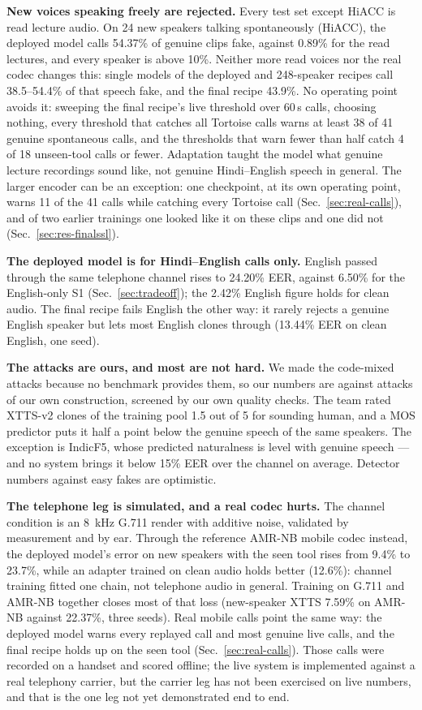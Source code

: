 \textbf{New voices speaking freely are rejected.} Every test set except HiACC is read
lecture audio. On 24 new speakers talking spontaneously (HiACC), the deployed model
calls 54.37\% of genuine clips fake, against 0.89\% for the read lectures, and every
speaker is above 10\%. Neither more read voices nor the real codec changes this: single
models of the deployed and 248-speaker recipes call 38.5--54.4\% of that speech fake, and
the final recipe 43.9\%. No operating point avoids it: sweeping the final recipe's live
threshold over 60\,s calls, choosing nothing, every threshold that catches all Tortoise calls
warns at least 38 of 41 genuine spontaneous calls, and the thresholds that warn fewer than
half catch 4 of 18 unseen-tool calls or fewer.
Adaptation taught the model what genuine lecture recordings sound like, not genuine
Hindi--English speech in general. The larger encoder can be an exception: one checkpoint, at
its own operating point, warns 11 of the 41 calls while catching every Tortoise call
(Sec.~\ref{sec:real-calls}), and of two earlier trainings one looked like it on these clips and
one did not (Sec.~\ref{sec:res-finalssl}).

\textbf{The deployed model is for Hindi--English calls only.} English passed through
the same telephone channel rises to 24.20\% EER, against 6.50\% for the English-only
S1 (Sec.~\ref{sec:tradeoff}); the 2.42\% English figure holds for clean audio. The final
recipe fails English the other way: it rarely rejects a genuine English speaker but lets
most English clones through (13.44\% EER on clean English, one seed).

\textbf{The attacks are ours, and most are not hard.} We made the code-mixed attacks
because no benchmark provides them, so our numbers are against attacks of our own
construction, screened by our own quality checks. The team rated XTTS-v2 clones of the training pool
1.5 out of 5 for sounding human, and a MOS predictor puts it half a point below the
genuine speech of the same speakers. The exception is IndicF5, whose predicted
naturalness is level with genuine speech --- and no system brings it below 15\% EER over
the channel on average. Detector numbers against easy fakes are optimistic.

\textbf{The telephone leg is simulated, and a real codec hurts.} The channel condition
is an 8~kHz G.711 render with additive noise, validated by measurement and by ear. Through
the reference AMR-NB mobile codec instead, the deployed model's error on new speakers
with the seen tool rises from 9.4\% to 23.7\%, while an adapter trained on clean audio
holds better (12.6\%): channel training fitted one chain, not telephone audio in
general. Training on G.711 and AMR-NB together closes most of that loss (new-speaker
XTTS 7.59\% on AMR-NB against 22.37\%, three seeds). Real mobile calls point the same way:
the deployed model warns every replayed call and most genuine live calls, and the final
recipe holds up on the seen tool (Sec.~\ref{sec:real-calls}). Those calls were recorded on a handset and scored offline;
the live system is implemented against a real telephony carrier, but the carrier leg has
not been exercised on live numbers, and that is the one leg not yet demonstrated end to
end.


